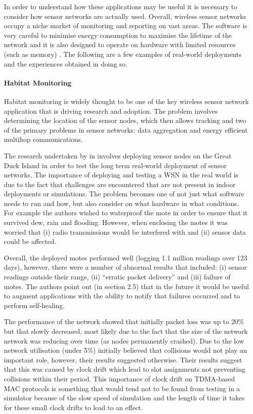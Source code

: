 In order to understand how these applications may be useful it is necessary to consider how sensor networks are actually used. Overall, wireless sensor networks occupy a niche market of monitoring and reporting on vast areas. The software is very careful to minimise energy consumption to maximise the lifetime of the network \cite{?} and it is also designed to operate on hardware with limited resources (such as memory) \cite{?}. The following are a few examples of real-world deployments and the experiences obtained in doing so.


\paragraph{Habitat Monitoring} Habitat monitoring is widely thought to be one of the key wireless sensor network application that is driving research and adoption. The problem involves determining the location of the sensor nodes, which then allows tracking \cite{Cerpa:2001:HMA:844193.844196} and two of the primary problems in sensor networks: data aggregation and energy efficient multihop communications.

The research undertaken by \citeauthor{SzewczykPMC04} in \cite{SzewczykPMC04} involves deploying sensor nodes on the Great Duck Island in order to test the long term real-world deployment of sensor networks. The importance of deploying and testing a WSN in the real world is due to the fact that challenges are encountered that are not present in indoor deployments or simulations. The problem becomes one of not just what software needs to run and how, but also consider on what hardware in what conditions. For example the authors wished to waterproof the mote in order to ensure that it survived dew, rain and flooding. However, when enclosing the motes it was worried that (i) radio transmissions would be interfered with and (ii) sensor data could be affected.

Overall, the deployed motes performed well (logging 1.1 million readings over 123 days), however, there were a number of abnormal results that included: (i) sensor readings outside their range, (ii) ``erratic packet delivery'' and (iii) failure of motes. The authors point out (in section 2.5) that in the future it would be useful to augment applications with the ability to notify that failures occurred and to perform self-healing.

The performance of the network showed that initially packet loss was up to 20\% but that slowly decreased, most likely due to the fact that the size of the network network was reducing over time (as nodes permanently crashed). Due to the low network utilisation (under 5\%) \citeauthor{SzewczykPMC04} initially believed that collisions would not play an important role, however, their results suggested otherwise. Their results suggest that this was caused by clock drift which lead to slot assignments not preventing collisions within their period. This importance of clock drift on TDMA-based MAC protocols is something that would tend not to be found from testing in a simulator because of the slow speed of simulation and the length of time it takes for these small clock drifts to lead to an effect.

